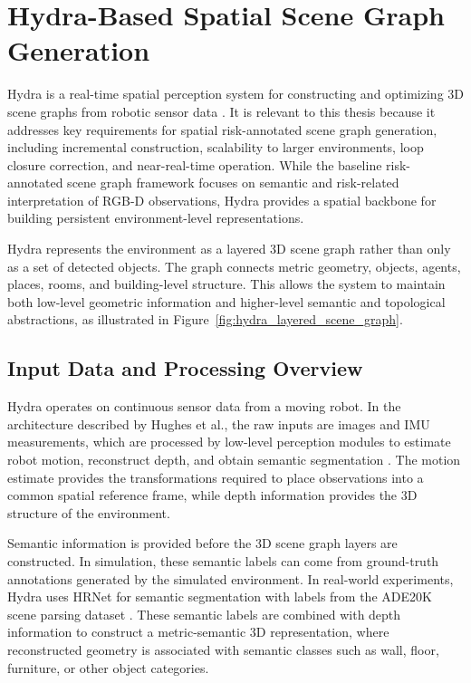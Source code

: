 \section{Hydra-Based Spatial Scene Graph Generation}

{\small

Hydra is a real-time spatial perception system for constructing and optimizing 3D scene graphs from robotic sensor data \cite{hughes2022hydra}. It is relevant to this thesis because it addresses key requirements for spatial risk-annotated scene graph generation, including incremental construction, scalability to larger environments, loop closure correction, and near-real-time operation. While the baseline risk-annotated scene graph framework focuses on semantic and risk-related interpretation of RGB-D observations, Hydra provides a spatial backbone for building persistent environment-level representations.

Hydra represents the environment as a layered 3D scene graph rather than only as a set of detected objects. The graph connects metric geometry, objects, agents, places, rooms, and building-level structure. This allows the system to maintain both low-level geometric information and higher-level semantic and topological abstractions, as illustrated in Figure~\ref{fig:hydra_layered_scene_graph}.
{\small



\subsection{Input Data and Processing Overview}

{\small

Hydra operates on continuous sensor data from a moving robot. In the architecture described by Hughes et al., the raw inputs are images and IMU measurements, which are processed by low-level perception modules to estimate robot motion, reconstruct depth, and obtain semantic segmentation \cite{hughes2022hydra}. The motion estimate provides the transformations required to place observations into a common spatial reference frame, while depth information provides the 3D structure of the environment.

Semantic information is provided before the 3D scene graph layers are constructed. In simulation, these semantic labels can come from ground-truth annotations generated by the simulated environment. In real-world experiments, Hydra uses HRNet for semantic segmentation with labels from the ADE20K scene parsing dataset \cite{hughes2022hydra,wang2021hrnet,zhou2017ade20k}. These semantic labels are combined with depth information to construct a metric-semantic 3D representation, where reconstructed geometry is associated with semantic classes such as wall, floor, furniture, or other object categories.

}}}
